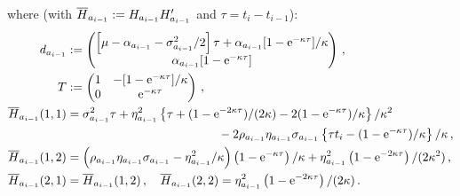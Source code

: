 where (with $\overline{H}_{a_{i-1}} := H_{a_{i-1}}H'_{a_{i-1}}$ and $\tau = t_i-t_{i-1}$):
\begin{align*}
d_{a_{i-1}} &\eqdef
\begin{pmatrix} \left[\mu- \alpha_{a_{i-1}} - \sigma^2_{a_{i-1}}/2 \right] \tau + \alpha_{a_{i-1}}[1-\rme^{-\kappa \tau}]/\kappa\\
\alpha_{a_{i-1}} [1-\rme^{-\kappa \tau}] \end{pmatrix}\eqsp,\\
T &\eqdef
\begin{pmatrix} 1 & -[1-\rme^{-\kappa \tau}]/\kappa \\ 0 & \rme^{-\kappa \tau}  \end{pmatrix} \eqsp,\\
\barH_{a_{i-1}}(1,1) &= \sigma^2_{a_{i-1}} \tau + \eta^2_{a_{i-1}}\left\{\tau  + (1-\rme^{-2\kappa \tau})/(2\kappa) - 2(1-\rme^{-\kappa \tau})/\kappa\right\}/\kappa^2 \\
&\hspace{4.4cm} - 2\rho_{a_{i-1}} \eta_{a_{i-1}} \sigma_{a_{i-1}}\left\{ \tau t_i - (1-\rme^{-\kappa \tau})/\kappa \right\}/\kappa\eqsp, \\
\barH_{a_{i-1}}(1,2) & = \left(\rho_{a_{i-1}} \eta_{a_{i-1}} \sigma_{a_{i-1}}-\eta^2_{a_{i-1}}/\kappa \right)\left(1-\rme^{-\kappa \tau} \right)/\kappa + \eta^2_{a_{i-1}}\left(1-\rme^{-2\kappa \tau} \right)/(2\kappa^2)\eqsp,\\
\barH_{a_{i-1}}(2,1) &= \barH_{a_{i-1}}(1,2)\eqsp, \quad \barH_{a_{i-1}}(2,2) = \eta^2_{a_{i-1}}\left( 1-\rme^{-2\kappa \tau} \right)/(2\kappa)\eqsp.
\end{align*}
